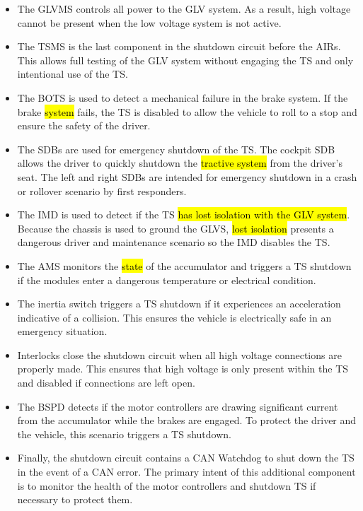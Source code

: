 \documentclass{article}
\DeclareRobustCommand{\hlr}[1]{{\sethlcolor{red}\hl{#1}}}
\begin{document}
                \begin{itemize}
                    \item The GLVMS controls all power to the GLV system. As a result, high voltage cannot be present when the low voltage system is not active.
                    \item The TSMS is the last component in the shutdown circuit before the AIRs. This allows full testing of the GLV system without engaging the TS and only intentional use of the TS.
                    \item The BOTS is used to detect a mechanical failure in the brake system. If the brake \hlr{system} fails, the TS is disabled to allow the vehicle to roll to a stop and ensure the safety of the driver.
                    \item The SDBs are used for emergency shutdown of the TS. The cockpit SDB allows the driver to quickly shutdown the \hlr{tractive system} from the driver's seat. The left and right SDBs are intended for emergency shutdown in a crash or rollover scenario by first responders.
                    \item The IMD is used to detect if the TS \hlr{has lost isolation with the GLV system}. Because the chassis is used to ground the GLVS, \hlr{lost isolation} presents a dangerous driver and maintenance scenario so the IMD disables the TS.
                    \item The AMS monitors the \hlr{state} of the accumulator and triggers a TS shutdown if the modules enter a dangerous temperature or electrical condition.
                    \item The inertia switch triggers a TS shutdown if it experiences an acceleration indicative of a collision. This ensures the vehicle is electrically safe in an emergency situation.
                    \item Interlocks close the shutdown circuit when all high voltage connections are properly made. This ensures that high voltage is only present within the TS and disabled if connections are left open.
                    \item The BSPD detects if the motor controllers are drawing significant current from the accumulator while the brakes are engaged. To protect the driver and the vehicle, this scenario triggers a TS shutdown.
                    \item Finally, the shutdown circuit contains a CAN Watchdog to shut down the TS in the event of a CAN error. The primary intent of this additional component is to monitor the health of the motor controllers and shutdown TS if necessary to protect them.
                \end{itemize}
\end{document}
